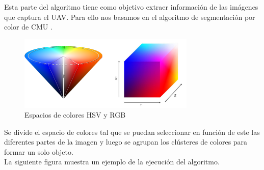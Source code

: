 Esta parte del algoritmo tiene como objetivo extraer información de las imágenes que captura el UAV. Para ello nos basamos en el algoritmo de segmentación por color de CMU \cite{JamesBruce_CMU_SEG}.  \\

\begin{figure}[h]
	\centering
	\includegraphics[width=0.75\textwidth,natwidth=944,natheight=400]{../Images/c2/HSV_vs_RGB.png}
	\caption{Espacios de colores HSV y RGB}
	\label{fig:HSV_vs_RGB}
\end{figure}

Se divide el espacio de colores tal que se puedan seleccionar en función de este las diferentes partes de la imagen y luego se agrupan los cl\'usteres de colores para formar un solo objeto. \\

La siguiente figura muestra un ejemplo de la ejecuci\'on del algoritmo.

